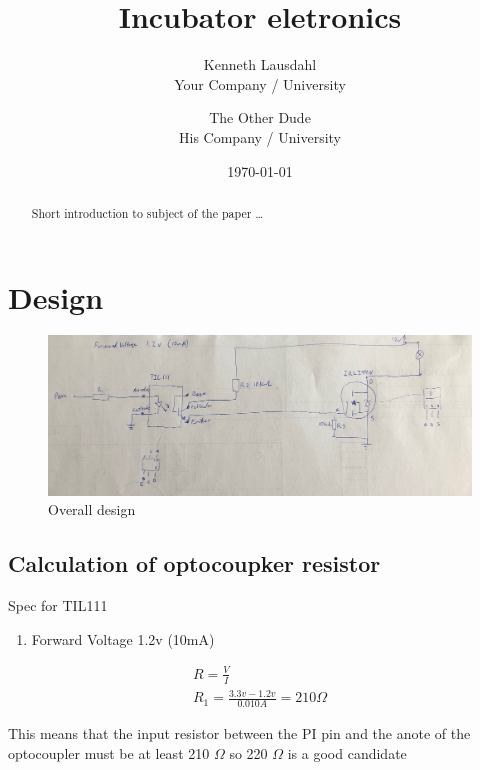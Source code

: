 \documentclass{article}
\title{Incubator eletronics}
\author{Kenneth Lausdahl  \\
	Your Company / University  \\
	\and 
	The Other Dude \\
	His Company / University \\
	}
\date{\today}
\begin{document}
\maketitle


\begin{abstract}
Short introduction to subject of the paper \ldots 
\end{abstract}

\section{Design}

\begin{figure}[!hpt]
\includegraphics[scale=0.1]{IMG_1614.jpeg}

\caption{Overall design}
\label{fig:overallDesign}
\end{figure}


\subsection{Calculation of optocoupker resistor}

Spec for TIL111

\begin{enumerate}
	\item Forward Voltage 1.2v (10mA)
\end{enumerate}





\begin{equation}
 \begin{array}{l}
R = \frac{V}{I}\\
R_1 = \frac{3.3v -1.2v }{ 0.010A} = 210 \Omega 
\end{array}
\end{equation}

This means that the input resistor between the PI pin and the anote of the optocoupler must be at least 210 $\Omega$ so 220 $\Omega$ is a good candidate
\end{document}
